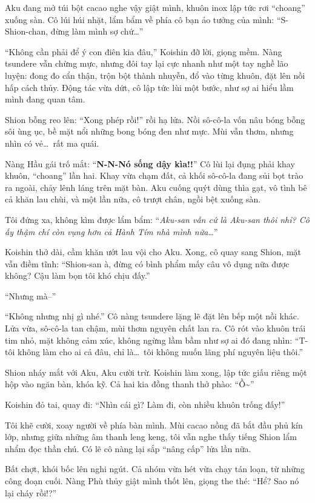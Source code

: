 \documentclass[../main.tex]{subfiles}
\begin{document}
Aku đang mở túi bột cacao nghe vậy giật mình, khuôn inox lập tức rơi ``choang'' xuống sàn. Cô lúi húi nhặt, lẩm bẩm về phía cô bạn ảo tưởng của mình: ``S-Shion-chan, đừng làm mình sợ chứ\dots''

``Không cần phải để ý con điên kia đâu,'' Koishin đỡ lời, giọng mềm. Nàng tsundere vẫn chừng mực, nhưng đôi tay lại cực nhanh như một tay nghề lão luyện: đong đo cẩn thận, trộn bột thành nhuyễn, đổ vào từng khuôn, đặt lên nồi hấp cách thủy. Động tác vừa dứt, cô lập tức lùi một bước, như sợ ai hiểu lầm mình đang quan tâm.

Shion bỗng reo lên: ``Xong phép rồi!'' rồi hạ lửa. Nồi sô-cô-la vốn nâu bóng bỗng sôi ùng ục, bề mặt nổi những bong bóng đen như mực. Mùi vẫn thơm, nhưng nhìn có vẻ\dots\ rất ma quái.

Nàng Hầu gái trố mắt: ``\textbf{N-N-Nó sống dậy kìa!!}'' Cô lùi lại đụng phải khay khuôn, ``choang'' lần hai. Khay vừa chạm đất, cả khối sô-cô-la đang sủi bọt trào ra ngoài, chảy lênh láng trên mặt bàn. Aku cuống quýt dùng thìa gạt, vô tình bê cả khăn lau chùi, và một lần nữa, cô trượt chân, ngồi bệt xuống sàn.

Tôi đứng xa, không kìm được lẩm bẩm: ``\textit{Aku-san vẫn cứ là Aku-san thôi nhỉ? Cô ấy thậm chí còn vụng hơn cả Hành Tím nhà mình nữa\dots}''

Koishin thở dài, cầm khăn ướt lau vội cho Aku. Xong, cô quay sang Shion, mặt vẫn điềm tĩnh: ``Shion-san à, đừng có bình phẩm mấy câu vô dụng nữa được không? Cậu làm bọn tôi khó chịu đấy.''

``Nhưng mà--''

``Không nhưng nhị gì nhé.'' Cô nàng tsundere lặng lẽ đặt lên bếp một nồi khác. Lửa vừa, sô-cô-la tan chậm, mùi thơm nguyên chất lan ra. Cô rót vào khuôn trái tim nhỏ, mặt không cảm xúc, không ngừng lầm bầm như sợ ai đó đang nhìn: ``T-tôi không làm cho ai cả đâu, chỉ là\dots\ tôi không muốn lãng phí nguyên liệu thôi.''

Shion nháy mắt với Aku, Aku cười trừ. Koishin làm xong, lập tức giấu riêng một hộp vào ngăn bàn, khóa kỹ. Cả hai kia đồng thanh thở phào: ``Ồ\~{}''

Koishin đỏ tai, quay đi: ``Nhìn cái gì? Làm đi, còn nhiều khuôn trống đấy!''

Tôi khẽ cười, xoay người về phía bàn mình. Mùi cacao nồng đã bắt đầu phủ kín lớp, nhưng giữa những âm thanh leng keng, tôi vẫn nghe thấy tiếng Shion lẩm nhẩm đọc thần chú. Có lẽ cô nàng lại sắp ``nâng cấp'' lửa lần nữa.

Bất chợt, khói bốc lên nghi ngút. Cả nhóm vừa hét vừa chạy tán loạn, từ những công đoạn cuối. Nàng Phù thủy giật mình thốt lên, giọng the thé: ``Hể? Sao nó lại cháy rồi!?''
\end{document}
